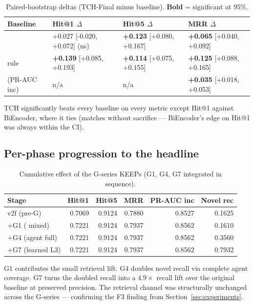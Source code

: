 \begin{table}[h]
\centering
\caption{Paired-bootstrap deltas (TCH-Final minus baseline). \textbf{Bold} = significant at 95\%.}
\label{tab:paired-deltas}
\small
\begin{tabular}{llll}
\toprule
Baseline & Hit@1 $\Delta$ & Hit@5 $\Delta$ & MRR $\Delta$ \\
\midrule
\bienc{} & $+0.027$ [-0.020, +0.072] (ns) & \textbf{+0.123} [+0.080, +0.167] & \textbf{+0.065} [+0.040, +0.092] \\
\hrrf{} rule & \textbf{+0.139} [+0.085, +0.193] & \textbf{+0.114} [+0.075, +0.155] & \textbf{+0.125} [+0.088, +0.165] \\
\hgb{} (PR-AUC inc) & n/a & n/a & \textbf{+0.035} [+0.018, +0.053] \\
\bottomrule
\end{tabular}
\end{table}

TCH significantly beats every baseline on every metric except Hit@1 against BiEncoder, where it ties (matches without sacrifice --- BiEncoder's edge on Hit@1 was always within the CI).

\subsection{Per-phase progression to the headline}

\begin{table}[h]
\centering
\caption{Cumulative effect of the G-series KEEPs (G1, G4, G7 integrated in sequence).}
\label{tab:cumulative}
\small
\begin{tabular}{lrrrrr}
\toprule
Stage & Hit@1 & Hit@5 & MRR & PR-AUC inc & Novel rec \\
\midrule
v2f (pre-G)            & 0.7069 & 0.9124 & 0.7880 & 0.8527 & 0.1625 \\
$+$G1 (\bienc{} mixed) & 0.7221 & 0.9124 & 0.7937 & 0.8562 & 0.1610 \\
$+$G4 (agent full)     & 0.7221 & 0.9124 & 0.7937 & 0.8562 & 0.3560 \\
$+$G7 (learned L3)     & 0.7221 & 0.9124 & 0.7937 & 0.8562 & 0.7932 \\
\bottomrule
\end{tabular}
\end{table}

G1 contributes the small retrieval lift. G4 doubles novel recall via complete agent coverage. G7 turns the doubled recall into a $4.9\times$ recall lift over the original baseline at preserved precision. The retrieval channel was structurally unchanged across the G-series --- confirming the F3 finding from Section~\ref{sec:experiments}.

